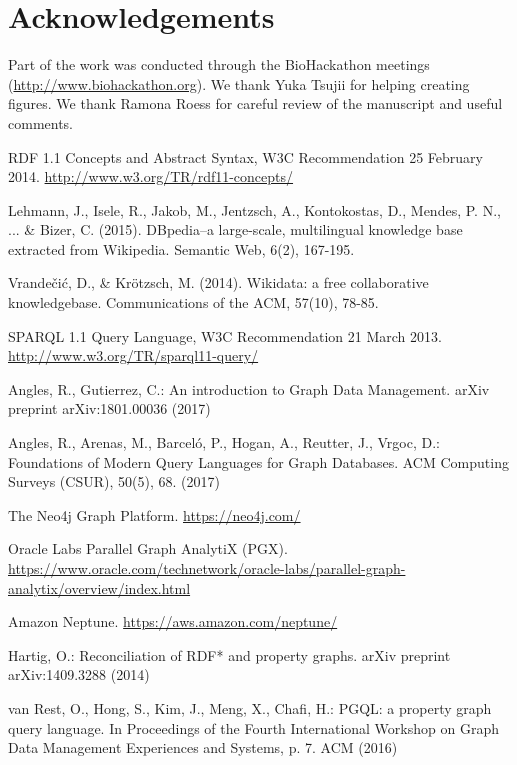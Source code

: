 \documentclass[runningheads]{llncs}
\begin{document}
\section*{Acknowledgements}
Part of the work was conducted through the BioHackathon meetings (\url{http://www.biohackathon.org}). We thank Yuka Tsujii for helping creating figures. We thank Ramona Roess for careful review of the manuscript and useful comments.

%
%
%

% 
%
\begin{thebibliography}{8}

RDF 1.1 Concepts and Abstract Syntax, W3C Recommendation 25 February 2014. \url{http://www.w3.org/TR/rdf11-concepts/}

Lehmann, J., Isele, R., Jakob, M., Jentzsch, A., Kontokostas, D., Mendes, P. N., ... & Bizer, C. (2015). DBpedia–a large-scale, multilingual knowledge base extracted from Wikipedia. Semantic Web, 6(2), 167-195.

Vrandečić, D., & Krötzsch, M. (2014). Wikidata: a free collaborative knowledgebase. Communications of the ACM, 57(10), 78-85.

SPARQL 1.1 Query Language, W3C Recommendation 21 March 2013. \url{http://www.w3.org/TR/sparql11-query/}

Angles, R., Gutierrez, C.: An introduction to Graph Data Management. arXiv preprint arXiv:1801.00036 (2017)

Angles, R., Arenas, M., Barceló, P., Hogan, A., Reutter, J., Vrgoc, D.: Foundations of Modern Query Languages for Graph Databases. ACM Computing Surveys (CSUR), 50(5), 68. (2017)

The Neo4j Graph Platform. \url{https://neo4j.com/}

Oracle Labs Parallel Graph AnalytiX (PGX). \url{https://www.oracle.com/technetwork/oracle-labs/parallel-graph-analytix/overview/index.html}

Amazon Neptune. \url{https://aws.amazon.com/neptune/}
 
Hartig, O.: Reconciliation of RDF* and property graphs. arXiv preprint arXiv:1409.3288 (2014)

van Rest, O., Hong, S., Kim, J., Meng, X., Chafi, H.: PGQL: a property graph query language. In Proceedings of the Fourth International Workshop on Graph Data Management Experiences and Systems, p. 7. ACM (2016)


\end{thebibliography}
\end{document}
